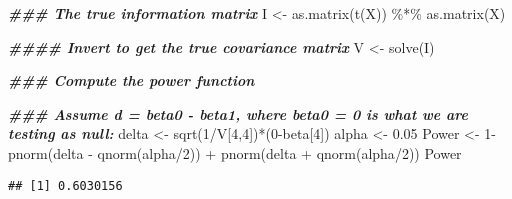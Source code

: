 \documentclass[
]{article}
\newenvironment{Shaded}{\begin{snugshade}}{\end{snugshade}}
\newcommand{\DecValTok}[1]{\textcolor[rgb]{0.00,0.00,0.81}{#1}}
\newcommand{\DocumentationTok}[1]{\textcolor[rgb]{0.56,0.35,0.01}{\textbf{\textit{#1}}}}
\newcommand{\FloatTok}[1]{\textcolor[rgb]{0.00,0.00,0.81}{#1}}
\newcommand{\FunctionTok}[1]{\textcolor[rgb]{0.00,0.00,0.00}{#1}}
\newcommand{\NormalTok}[1]{#1}
\newcommand{\OtherTok}[1]{\textcolor[rgb]{0.56,0.35,0.01}{#1}}
\newcommand{\SpecialCharTok}[1]{\textcolor[rgb]{0.00,0.00,0.00}{#1}}
\begin{document}
\begin{Shaded}
\begin{Highlighting}[]
\DocumentationTok{\#\#\# The true information matrix}
\NormalTok{I }\OtherTok{\textless{}{-}} \FunctionTok{as.matrix}\NormalTok{(}\FunctionTok{t}\NormalTok{(X)) }\SpecialCharTok{\%*\%} \FunctionTok{as.matrix}\NormalTok{(X)}



\DocumentationTok{\#\#\#\# Invert to get the true covariance matrix }
\NormalTok{V }\OtherTok{\textless{}{-}} \FunctionTok{solve}\NormalTok{(I)}


\DocumentationTok{\#\#\# Compute the power function }

\DocumentationTok{\#\#\# Assume d = beta0 {-} beta1, where beta0 = 0 is what we are testing as null:}
\NormalTok{delta }\OtherTok{\textless{}{-}} \FunctionTok{sqrt}\NormalTok{(}\DecValTok{1}\SpecialCharTok{/}\NormalTok{V[}\DecValTok{4}\NormalTok{,}\DecValTok{4}\NormalTok{])}\SpecialCharTok{*}\NormalTok{(}\DecValTok{0}\SpecialCharTok{{-}}\NormalTok{beta[}\DecValTok{4}\NormalTok{])}
\NormalTok{alpha }\OtherTok{\textless{}{-}} \FloatTok{0.05}
\NormalTok{Power }\OtherTok{\textless{}{-}} \DecValTok{1}\SpecialCharTok{{-}} \FunctionTok{pnorm}\NormalTok{(delta }\SpecialCharTok{{-}} \FunctionTok{qnorm}\NormalTok{(alpha}\SpecialCharTok{/}\DecValTok{2}\NormalTok{)) }\SpecialCharTok{+} \FunctionTok{pnorm}\NormalTok{(delta }\SpecialCharTok{+} \FunctionTok{qnorm}\NormalTok{(alpha}\SpecialCharTok{/}\DecValTok{2}\NormalTok{))}
\NormalTok{Power}
\end{Highlighting}
\end{Shaded}

\begin{verbatim}
## [1] 0.6030156
\end{verbatim}
\end{document}
